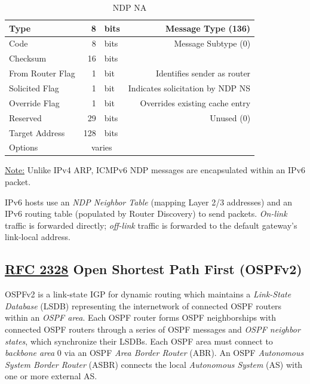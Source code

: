 \documentclass[12pt]{article}
\newif\ifcolor											%
\newcommand{\note}[1]{\ifcolor \colorbox{#1}{Note:}\else \underline{Note:}\fi}
\newcommand{\RFC}[1]{\href{https://datatracker.ietf.org/doc/html/rfc#1}{RFC #1}}
\newcommand{\mc}[3]{\multicolumn{#1}{#2}{#3}}
\begin{document}
	\begin{table}[H]
	\centering
	\caption{NDP NA \label{tab:NDP NA}}
	\begin{tabular}{| l | r @{ } l | r |}\hline
	Type				& 8		& bits	& Message Type (136)\\\hline
	Code				& 8		& bits	& Message Subtype (0)\\\hline
	Checksum			& 16		& bits	&\\\hline
	From Router Flag		& 1		& bit 		& Identifies sender as router\\\hline
	Solicited Flag		& 1		& bit 		& Indicates solicitation by NDP NS\\\hline
	Override Flag		& 1		& bit 		& Overrides existing cache entry\\\hline
	Reserved			& 29		& bits	& Unused (0)\\\hline
	Target Address		& 128		& bits	&\\\hline
	Options			& \mc{2}{c|}{varies}	&\\\hline
	\end{tabular}\end{table}
	\note{Goldenrod} Unlike IPv4 ARP, ICMPv6 NDP messages are encapsulated within an IPv6 packet.

	IPv6 hosts use an \textit{NDP Neighbor Table} (mapping Layer 2/3 addresses) and an IPv6 routing table (populated by Router Discovery) to send packets. \textit{On-link} traffic is forwarded directly; \textit{off-link} traffic is forwarded to the default gateway's link-local address.


	\subsection[RFC 2328 OSPFv2]{\RFC{2328} Open Shortest Path First (OSPFv2) \label{subsec:OSPF}}
	OSPFv2 is a link-state IGP for dynamic routing which maintains a \textit{Link-State Database} (LSDB) representing the internetwork of connected OSPF routers within an \textit{OSPF area}. Each OSPF router forms OSPF neighborships with connected OSPF routers through a series of OSPF messages and \textit{OSPF neighbor states}, which synchronize their LSDBs. Each OSPF area must connect to \textit{backbone area} 0 via an OSPF \textit{Area Border Router} (ABR). An OSPF \textit{Autonomous System Border Router} (ASBR) connects the local \textit{Autonomous System} (AS) with one or more external AS.
\end{document}
